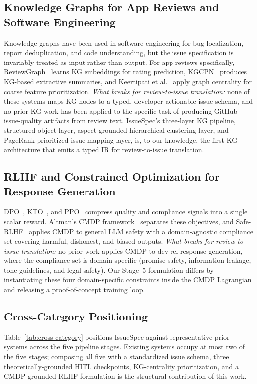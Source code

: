 \documentclass[sigconf, anonymous]{acmart}
\begin{document}
\subsection{Knowledge Graphs for App Reviews and Software Engineering}
Knowledge graphs have been used in software engineering for bug localization, report deduplication, and code understanding, but the issue specification is invariably treated as input rather than output. For app reviews specifically, ReviewGraph~\cite{de2025reviewgraph} learns KG embeddings for rating prediction, KGCPN~\cite{yu2024knowledge} produces KG-based extractive summaries, and Keertipati et al.~\cite{keertipati2016approaches} apply graph centrality for coarse feature prioritization. \emph{What breaks for review-to-issue translation:} none of these systems maps KG nodes to a typed, developer-actionable issue schema, and no prior KG work has been applied to the specific task of producing GitHub-issue-quality artifacts from review text. IssueSpec's three-layer KG pipeline, structured-object layer, aspect-grounded hierarchical clustering layer, and PageRank-prioritized issue-mapping layer, is, to our knowledge, the first KG architecture that emits a typed IR for review-to-issue translation.

\subsection{RLHF and Constrained Optimization for Response Generation}
DPO~\cite{rafailov2023direct}, KTO~\cite{ethayarajh2024kto}, and PPO~\cite{schulman2017proximal} compress quality and compliance signals into a single scalar reward. Altman's CMDP framework~\cite{altman2021constrained} separates these objectives, and Safe-RLHF~\cite{dai2024safe} applies CMDP to general LLM safety with a domain-agnostic compliance set covering harmful, dishonest, and biased outputs. \emph{What breaks for review-to-issue translation:} no prior work applies CMDP to dev-rel response generation, where the compliance set is domain-specific (promise safety, information leakage, tone guidelines, and legal safety). Our Stage~5 formulation differs by instantiating these four domain-specific constraints inside the CMDP Lagrangian and releasing a proof-of-concept training loop.

\subsection{Cross-Category Positioning}
Table~\ref{tab:cross-category} positions IssueSpec against representative prior systems across the five pipeline stages. Existing systems occupy at most two of the five stages; composing all five with a standardized issue schema, three theoretically-grounded HITL checkpoints, KG-centrality prioritization, and a CMDP-grounded RLHF formulation is the structural contribution of this work.
\end{document}
